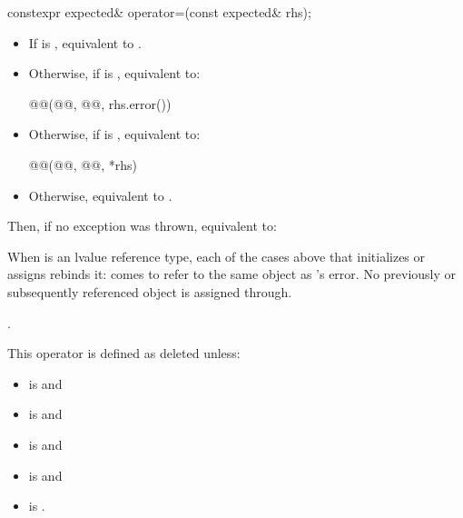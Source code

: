 %
\begin{itemdecl}
constexpr expected& operator=(const expected& rhs);
\end{itemdecl}

\begin{itemdescr}
\pnum
\effects
\begin{itemize}
\item
If  is ,
equivalent to .
\item
Otherwise, if  is , equivalent to:
\begin{codeblock}
@@(@@, @@, rhs.error())
\end{codeblock}
\item
Otherwise, if  is , equivalent to:
\begin{codeblock}
@@(@@, @@, *rhs)
\end{codeblock}
\item
Otherwise, equivalent to .
\end{itemize}
Then, if no exception was thrown,
equivalent to: 

\begin{addedblock}
\pnum
When  is an lvalue reference type, each of the cases above that
initializes or assigns  rebinds it:  comes to
refer to the same object as 's error. No previously or
subsequently referenced object is assigned through.
\end{addedblock}

\pnum
\returns
{}.

\pnum
\remarks
This operator is defined as deleted unless:
\begin{itemize}
\item
{} is  and
\item
{} is  and
\item
{} is  and
\item
{} is  and
\item
{}
is .
\end{itemize}


\end{itemdescr}
